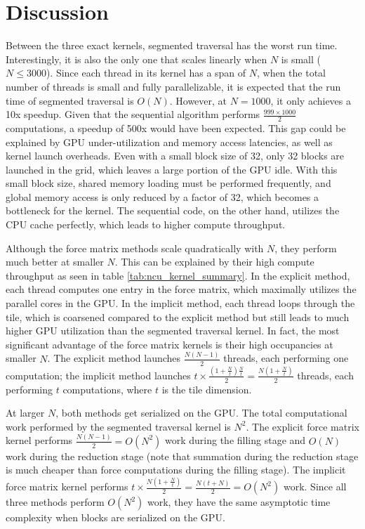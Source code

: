 \documentclass[12pt]{article}
\begin{document}
\section{Discussion}
Between the three exact kernels, segmented traversal has the worst run time. Interestingly, it is also the only one that scales linearly when $N$ is small ($N\le3000$). Since each thread in its kernel has a span of $N$, when the total number of threads is small and fully parallelizable, it is expected that the run time of segmented traversal is $O(N)$. However, at $N=1000$, it only achieves a 10x speedup. Given that the sequential algorithm performs $\frac{999\times 1000}{2}$ computations, a speedup of 500x would have been expected. This gap could be explained by GPU under-utilization and memory access latencies, as well as kernel launch overheads. Even with a small block size of 32, only 32 blocks are launched in the grid, which leaves a large portion of the GPU idle. With this small block size, shared memory loading must be performed frequently, and global memory access is only reduced by a factor of 32, which becomes a bottleneck for the kernel. The sequential code, on the other hand, utilizes the CPU cache perfectly, which leads to higher compute throughput.

Although the force matrix methods scale quadratically with $N$, they perform much better at smaller $N$. This can be explained by their high compute throughput as seen in table \ref{tab:ncu_kernel_summary}. In the explicit method, each thread computes one entry in the force matrix, which maximally utilizes the parallel cores in the GPU. In the implicit method, each thread loops through the tile, which is coarsened compared to the explicit method but still leads to much higher GPU utilization than the segmented traversal kernel. In fact, the most significant advantage of the force matrix kernels is their high occupancies at smaller $N$. The explicit method launches $\frac{N(N-1)}{2}$ threads, each performing one computation; the implicit method launches $t\times \frac{(1+\frac{N}{t})\frac{N}{t}}{2}=\frac{N(1+\frac{N}{t})}{2}$ threads, each performing $t$ computations, where $t$ is the tile dimension.

At larger $N$, both methods get serialized on the GPU. The total computational work performed by the segmented traversal kernel is $N^2$. The explicit force matrix kernel performs $\frac{N(N-1)}{2}=O(N^2)$ work during the filling stage and $O(N)$ work during the reduction stage (note that summation during the reduction stage is much cheaper than force computations during the filling stage). The implicit force matrix kernel performs $t\times \frac{N(1+\frac{N}{t})}{2}=\frac{N(t+N)}{2}=O(N^2)$ work. Since all three methods perform $O(N^2)$ work, they have the same asymptotic time complexity when blocks are serialized on the GPU.
\end{document}
